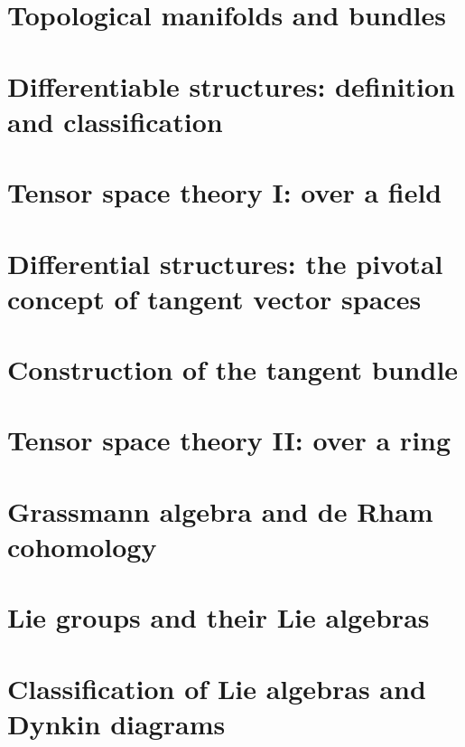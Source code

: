 \documentclass[a4paper,11pt]{article}
\theoremstyle{definition}
\theoremstyle{plain}
\theoremstyle{remark}
\begin{document}
\section{Topological manifolds and bundles}

\newpage

\section{Differentiable structures: definition and classification}

\newpage

\section{Tensor space theory I: over a field}

\newpage

\section{Differential structures: the pivotal concept of tangent vector spaces}

\newpage

\section{Construction of the tangent bundle}

\newpage

\section{Tensor space theory II: over a ring}

\newpage

\section{Grassmann algebra and de Rham cohomology}

\newpage

\section{Lie groups and their Lie algebras}

\newpage

\section{Classification of Lie algebras and Dynkin diagrams}

\newpage
\end{document}
